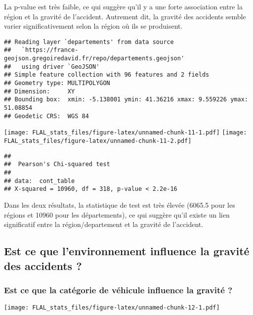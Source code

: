 \documentclass[
]{article}
\begin{document}
La p-value est très faible, ce qui suggère qu'il y a une forte
association entre la région et la gravité de l'accident. Autrement dit,
la gravité des accidents semble varier significativement selon la région
où ils se produisent.

\begin{verbatim}
## Reading layer `departements' from data source 
##   `https://france-geojson.gregoiredavid.fr/repo/departements.geojson' 
##   using driver `GeoJSON'
## Simple feature collection with 96 features and 2 fields
## Geometry type: MULTIPOLYGON
## Dimension:     XY
## Bounding box:  xmin: -5.138001 ymin: 41.36216 xmax: 9.559226 ymax: 51.08854
## Geodetic CRS:  WGS 84
\end{verbatim}

\texttt{[image: FLAL\_stats\_files/figure-latex/unnamed-chunk-11-1.pdf]}
\texttt{[image: FLAL\_stats\_files/figure-latex/unnamed-chunk-11-2.pdf]}

\begin{verbatim}
## 
##  Pearson's Chi-squared test
## 
## data:  cont_table
## X-squared = 10960, df = 318, p-value < 2.2e-16
\end{verbatim}

Dans les deux résultats, la statistique de test est très élevée (6065.5
pour les régions et 10960 pour les départements), ce qui suggère qu'il
existe un lien significatif entre la région/departement et la gravité de
l'accident.

\hypertarget{est-ce-que-lenvironnement-influence-la-gravituxe9-des-accidents}{%
\subsection{Est ce que l'environnement influence la gravité des
accidents
?}\label{est-ce-que-lenvironnement-influence-la-gravituxe9-des-accidents}}

\hypertarget{est-ce-que-la-catuxe9gorie-de-vuxe9hicule-influence-la-gravituxe9}{%
\subsubsection{Est ce que la catégorie de véhicule influence la gravité
?}\label{est-ce-que-la-catuxe9gorie-de-vuxe9hicule-influence-la-gravituxe9}}

\texttt{[image: FLAL\_stats\_files/figure-latex/unnamed-chunk-12-1.pdf]}
\end{document}
